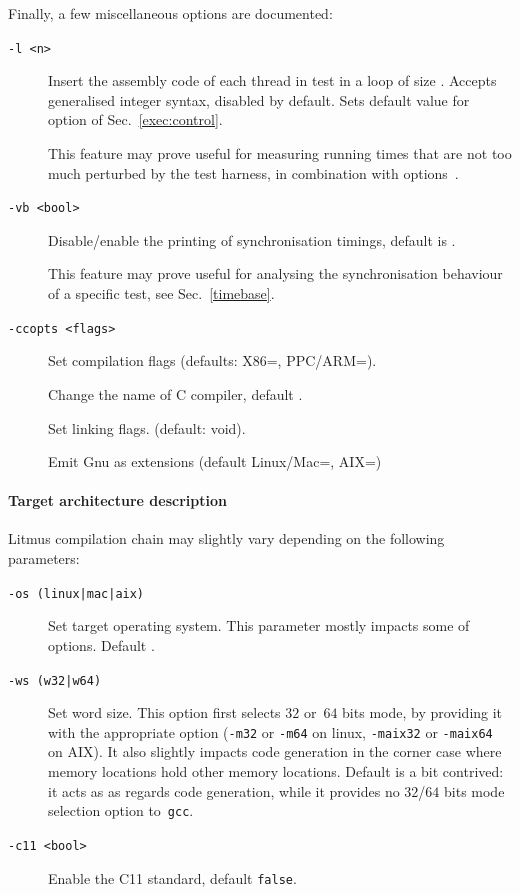 Finally, a few miscellaneous options are documented:
\begin{description}
\item[{\tt -l <n>}]
Insert the assembly code of each thread in test in a loop of size .
Accepts generalised integer syntax, disabled by default.
Sets default value for option  of Sec.~\ref{exec:control}.

This feature may prove useful for measuring running times that are not
too much perturbed by the test harness, in combination
with options~.
\item[{\tt -vb <bool>}]
Disable/enable the printing of synchronisation timings, default is .

This feature may prove useful for analysing the synchronisation behaviour of
a specific test, see Sec.~\ref{timebase}.
\item[{\tt -ccopts <flags>}] Set  compilation flags
(defaults: X86=, PPC/ARM=).
\item[]
Change the name of C compiler, default .
\item[] Set  linking flags.
(default: void).
\item[]
Emit Gnu as extensions  (default Linux/Mac=, AIX=)
\end{description}

\paragraph*{Target architecture description}
Litmus compilation chain may slightly vary depending on the following
parameters:
\begin{description}
\item[{\tt -os (linux|mac|aix)}] Set target operating system.
This parameter mostly impacts some of  options. Default .
\item[{\tt -ws (w32|w64)}] Set word size.
This option first selects  $32$ or~$64$ bits mode,
by providing it with the appropriate option (\texttt{-m32}
or \texttt{-m64} on linux, \texttt{-maix32}
or \texttt{-maix64} on AIX).
It also slightly impacts code generation in the corner case
where memory locations hold other memory locations.
Default is a bit contrived: it acts as  as regards code
generation, while it provides no $32$/$64$ bits mode selection option
to~\texttt{gcc}.
\item[\tt -c11 <bool>] Enable the C11 standard, default \texttt{false}.
\end{description}

